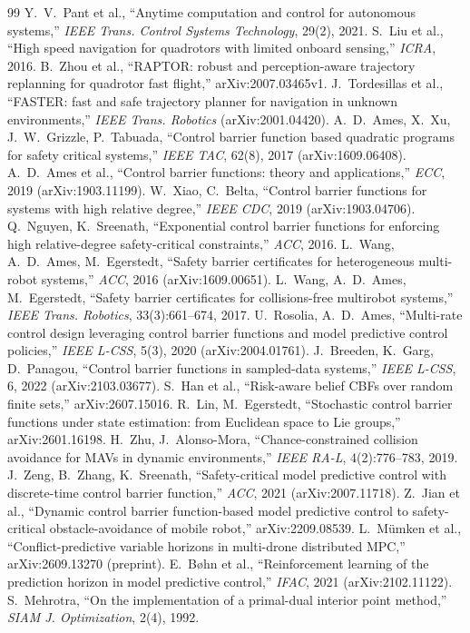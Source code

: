 \documentclass[11pt,a4paper]{article}
\numberwithin{equation}{section}
\theoremstyle{definition}
\theoremstyle{plain}
\theoremstyle{remark}
\begin{document}
\begin{thebibliography}{99}
 Y.~V.~Pant et al., ``Anytime computation and control for autonomous systems,'' \emph{IEEE Trans. Control Systems Technology}, 29(2), 2021.
 S.~Liu et al., ``High speed navigation for quadrotors with limited onboard sensing,'' \emph{ICRA}, 2016.
 B.~Zhou et al., ``RAPTOR: robust and perception-aware trajectory replanning for quadrotor fast flight,'' arXiv:2007.03465v1.
 J.~Tordesillas et al., ``FASTER: fast and safe trajectory planner for navigation in unknown environments,'' \emph{IEEE Trans. Robotics} (arXiv:2001.04420).
 A.~D.~Ames, X.~Xu, J.~W.~Grizzle, P.~Tabuada, ``Control barrier function based quadratic programs for safety critical systems,'' \emph{IEEE TAC}, 62(8), 2017 (arXiv:1609.06408).
 A.~D.~Ames et al., ``Control barrier functions: theory and applications,'' \emph{ECC}, 2019 (arXiv:1903.11199).
 W.~Xiao, C.~Belta, ``Control barrier functions for systems with high relative degree,'' \emph{IEEE CDC}, 2019 (arXiv:1903.04706).
 Q.~Nguyen, K.~Sreenath, ``Exponential control barrier functions for enforcing high relative-degree safety-critical constraints,'' \emph{ACC}, 2016.
 L.~Wang, A.~D.~Ames, M.~Egerstedt, ``Safety barrier certificates for heterogeneous multi-robot systems,'' \emph{ACC}, 2016 (arXiv:1609.00651).
 L.~Wang, A.~D.~Ames, M.~Egerstedt, ``Safety barrier certificates for collisions-free multirobot systems,'' \emph{IEEE Trans. Robotics}, 33(3):661--674, 2017.
 U.~Rosolia, A.~D.~Ames, ``Multi-rate control design leveraging control barrier functions and model predictive control policies,'' \emph{IEEE L-CSS}, 5(3), 2020 (arXiv:2004.01761).
 J.~Breeden, K.~Garg, D.~Panagou, ``Control barrier functions in sampled-data systems,'' \emph{IEEE L-CSS}, 6, 2022 (arXiv:2103.03677).
 S.~Han et al., ``Risk-aware belief CBFs over random finite sets,'' arXiv:2607.15016.
 R.~Lin, M.~Egerstedt, ``Stochastic control barrier functions under state estimation: from Euclidean space to Lie groups,'' arXiv:2601.16198.
 H.~Zhu, J.~Alonso-Mora, ``Chance-constrained collision avoidance for MAVs in dynamic environments,'' \emph{IEEE RA-L}, 4(2):776--783, 2019.
 J.~Zeng, B.~Zhang, K.~Sreenath, ``Safety-critical model predictive control with discrete-time control barrier function,'' \emph{ACC}, 2021 (arXiv:2007.11718).
 Z.~Jian et al., ``Dynamic control barrier function-based model predictive control to safety-critical obstacle-avoidance of mobile robot,'' arXiv:2209.08539.
 L.~M\"umken et al., ``Conflict-predictive variable horizons in multi-drone distributed MPC,'' arXiv:2609.13270 (preprint).
 E.~B\o hn et al., ``Reinforcement learning of the prediction horizon in model predictive control,'' \emph{IFAC}, 2021 (arXiv:2102.11122).
 S.~Mehrotra, ``On the implementation of a primal-dual interior point method,'' \emph{SIAM J. Optimization}, 2(4), 1992.
\end{thebibliography}
\end{document}
